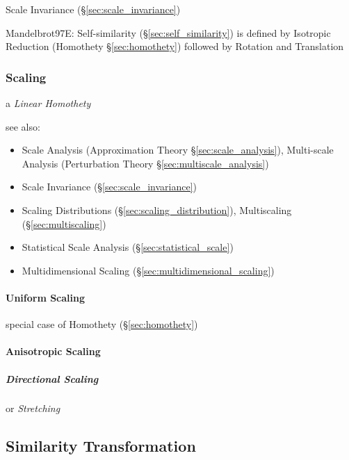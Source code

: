\fist Scale Invariance (\S\ref{sec:scale_invariance})

Mandelbrot97E: Self-similarity (\S\ref{sec:self_similarity}) is defined by
Isotropic Reduction (Homothety \S\ref{sec:homothety}) followed by Rotation and
Translation



\subsubsection{Scaling}\label{sec:scaling}

a \emph{Linear Homothety}

see also:
\begin{itemize}
  \item Scale Analysis (Approximation Theory \S\ref{sec:scale_analysis}),
    Multi-scale Analysis (Perturbation Theory \S\ref{sec:multiscale_analysis})
  \item Scale Invariance (\S\ref{sec:scale_invariance})
  \item Scaling Distributions (\S\ref{sec:scaling_distribution}), Multiscaling
    (\S\ref{sec:multiscaling})
  \item Statistical Scale Analysis (\S\ref{sec:statistical_scale})
  \item Multidimensional Scaling (\S\ref{sec:multidimensional_scaling})
\end{itemize}



\paragraph{Uniform Scaling}\label{sec:uniform_scaling}\hfill

special case of Homothety (\S\ref{sec:homothety})



\paragraph{Anisotropic Scaling}\label{sec:anisotropic_scaling}\hfill

\subparagraph{Directional Scaling}\label{sec:directional_scaling}\hfill

or \emph{Stretching}



\subsection{Similarity Transformation}\label{sec:similarity_transformation}

